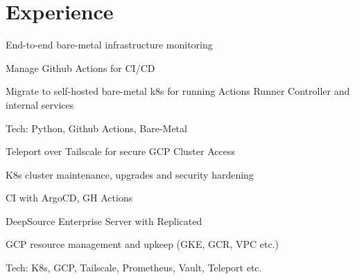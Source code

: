 \documentclass[]{config}
\begin{document}
\hfill
\begin{minipage}[t]{0.66\textwidth}


\section{Experience}
\vspace{\topsep} %
\begin{tightemize}
\item End-to-end bare-metal infrastructure monitoring
\item Manage Github Actions for CI/CD
\item Migrate to self-hosted bare-metal k8s for running Actions Runner Controller and internal services
\item Tech: Python, Github Actions, Bare-Metal
\end{tightemize}
\sectionsep

\begin{tightemize}
\item Teleport over Tailscale for secure GCP Cluster Access
\item K8s cluster maintenance, upgrades and security hardening
\item CI with ArgoCD, GH Actions
\item DeepSource Enterprise Server with Replicated
\item GCP resource management and upkeep (GKE, GCR, VPC etc.)
\item Tech: K8s, GCP, Tailscale, Prometheus, Vault, Teleport etc.
\end{tightemize}
\sectionsep


\end{minipage}
\end{document}
